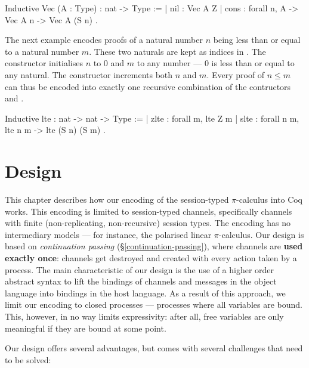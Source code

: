 \documentclass{mproj}
\newcommand{\picalc}{$\pi$-calculus}
\begin{document}
\begin{coq}
Inductive Vec (A : Type) : nat -> Type :=
| nil  : Vec A Z
| cons : forall {n}, A -> Vec A n -> Vec A (S n)
.
\end{coq}

The next example encodes proofs of a natural number $n$ being less than or equal to a natural number $m$. These two naturals are kept as indices in . The constructor  initialises $n$ to 0 and $m$ to any number --- 0 is less than or equal to any natural. The constructor  increments both $n$ and $m$. Every proof of $n \leq m$ can thus be encoded into exactly one recursive combination of the contructors  and .

\begin{coq}
Inductive lte : nat -> nat -> Type :=
| zlte : forall {m}, lte Z m
| slte : forall {n m}, lte n m -> lte (S n) (S m)
.
\end{coq}

\chapter{Design}\label{design}

This chapter describes how our encoding of the session-typed \picalc{} into Coq works. This encoding is limited to session-typed channels, specifically channels with finite (non-replicating, non-recursive) session types. The encoding has no intermediary models --- for instance, the polarised linear \picalc{}. Our design is based on \emph{continuation passing} (\S \ref{continuation-passing}), where channels are \textbf{used exactly once}: channels get destroyed and created with every action taken by a process.  The main characteristic of our design is the use of a higher order abstract syntax to lift the bindings of channels and messages in the object language into bindings in the host language. As a result of this approach, we limit our encoding to closed processes --- processes where all variables are bound. This, however, in no way limits expressivity: after all, free variables are only meaningful if they are bound at some point.

Our design offers several advantages, but comes with several challenges that need to be solved:
\end{document}
